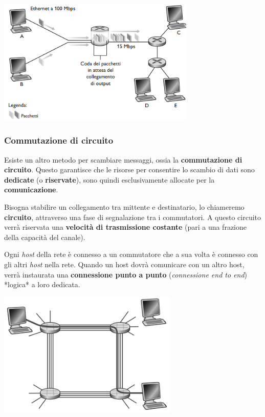 \includegraphics[width=\textwidth, height=6cm, keepaspectratio]{img/commutazione_di_pacchetto.png}

\subsubsection{Commutazione di circuito}
Esiste un altro metodo per scambiare messaggi, ossia la \textbf{commutazione di circuito}. Questo garantisce che le risorse per consentire lo scambio di dati sono \textbf{dedicate} (o \textbf{riservate}), sono quindi esclusivamente allocate per la \textbf{comunicazione}.

Bisogna stabilire un collegamento tra mittente e destinatario, lo chiameremo \textbf{circuito}, attraverso una fase di segnalazione tra i commutatori. A questo circuito verrà riservata una \textbf{velocità di trasmissione costante} (pari a una frazione della capacità del canale).

Ogni \textit{host} della rete è connesso a un commutatore che a sua volta è connesso con gli altri \textit{host} nella rete. Quando un host dovrà comunicare con un altro host, verrà instaurata una \textbf{connessione punto a punto} (\textit{connessione end to end}) *logica* a loro dedicata.

\includegraphics[width=\textwidth, height=6cm, keepaspectratio]{img/commutazione_di_circuito.png}

